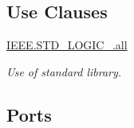 \subsection*{Use Clauses}
 \begin{DoxyCompactItemize}
\item 
\hypertarget{classADC__TOP_a68c233289eaf7d2601307bdd93b4c299}{\hyperlink{classADC__TOP_a68c233289eaf7d2601307bdd93b4c299}{I\-E\-E\-E.\-S\-T\-D\-\_\-\-L\-O\-G\-I\-C\-\_.\-all}   }\label{classADC__TOP_a68c233289eaf7d2601307bdd93b4c299}

\begin{DoxyCompactList}\small\item\em Use of standard library. \end{DoxyCompactList}\end{DoxyCompactItemize}
\subsection*{Ports}
